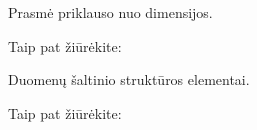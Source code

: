 \documentclass[letterpaper,10pt,lithuanian]{sphinxmanual}
\begin{document}
\begin{fulllineitems}
\label{\detokenize{formatas:ref}}
\pysigstartsignatures
{}
\pysigstopsignatures
\sphinxAtStartPar
{}

\sphinxAtStartPar
Prasmė priklauso nuo dimensijos.


\begin{sphinxseealso}{Taip pat žiūrėkite:}

\begin{DUlineblock}{0em}
\item[] {\hyperref[\detokenize{identifikatoriai:rysiai}]{}}
\item[] {\hyperref[\detokenize{vienetai:matavimo-vienetai}]{}}
\item[] {\hyperref[\detokenize{dimensijos:enum}]{}}
\end{DUlineblock}


\end{sphinxseealso}


\end{fulllineitems}


\begin{fulllineitems}
\label{\detokenize{formatas:source}}
\pysigstartsignatures
{}
\pysigstopsignatures
\sphinxAtStartPar
{}

\sphinxAtStartPar
Duomenų šaltinio struktūros elementai.


\begin{sphinxseealso}{Taip pat žiūrėkite:}

\begin{DUlineblock}{0em}
\item[] {\hyperref[\detokenize{saltiniai:duomenu-saltiniai}]{}}
\end{DUlineblock}


\end{sphinxseealso}


\end{fulllineitems}

\end{document}
